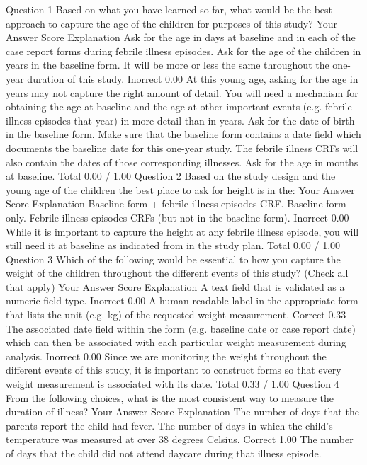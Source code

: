 Question 1
Based on what you have learned so far, what would be the best approach to capture the age of the children for purposes of this study?
Your Answer		Score	Explanation
Ask for the age in days at baseline and in each of the case report forms during febrile illness episodes.			
Ask for the age of the children in years in the baseline form. It will be more or less the same throughout the one-year duration of this study.	Inorrect	0.00	At this young age, asking for the age in years may not capture the right amount of detail. You will need a mechanism for obtaining the age at baseline and the age at other important events (e.g. febrile illness episodes that year) in more detail than in years.
Ask for the date of birth in the baseline form. Make sure that the baseline form contains a date field which documents the baseline date for this one-year study. The febrile illness CRFs will also contain the dates of those corresponding illnesses.			
Ask for the age in months at baseline.			
Total		0.00 / 1.00	
Question 2
Based on the study design and the young age of the children the best place to ask for height is in the:
Your Answer		Score	Explanation
Baseline form + febrile illness episodes CRF.			
Baseline form only.			
Febrile illness episodes CRFs (but not in the baseline form).	Inorrect	0.00	While it is important to capture the height at any febrile illness episode, you will still need it at baseline as indicated from in the study plan.
Total		0.00 / 1.00	
Question 3
Which of the following would be essential to how you capture the weight of the children throughout the different events of this study? (Check all that apply)
Your Answer		Score	Explanation
A text field that is validated as a numeric field type.	Inorrect	0.00	
A human readable label in the appropriate form that lists the unit (e.g. kg) of the requested weight measurement.	Correct	0.33	
The associated date field within the form (e.g. baseline date or case report date) which can then be associated with each particular weight measurement during analysis.	Inorrect	0.00	Since we are monitoring the weight throughout the different events of this study, it is important to construct forms so that every weight measurement is associated with its date.
Total		0.33 / 1.00	
Question 4
From the following choices, what is the most consistent way to measure the duration of illness?
Your Answer		Score	Explanation
The number of days that the parents report the child had fever.			
The number of days in which the child's temperature was measured at over 38 degrees Celsius.	Correct	1.00	
The number of days that the child did not attend daycare during that illness episode.			
